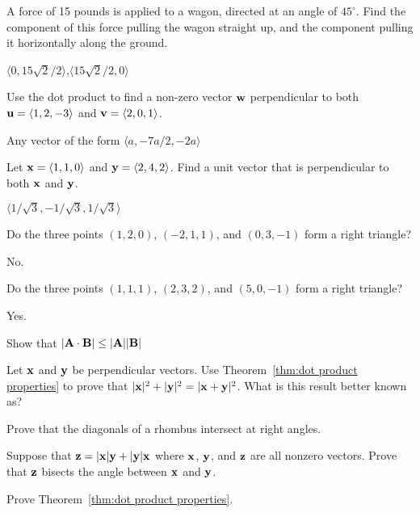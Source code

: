 \begin{enumialphparenastyle}
\begin{ex}
A force of 15 pounds is applied to a wagon, directed at an
angle of $45^\circ$. Find the component of this force pulling the
wagon straight up, and the component pulling it horizontally along
the ground.
\begin{sol}
	$\langle 0,15\sqrt2/2\rangle$,$\langle 15\sqrt2/2,0\rangle$
\end{sol}
\end{ex}

\begin{ex}
Use the dot product to find a non-zero vector ${\bf w}$
perpendicular to both ${\bf u}=\langle 1,2,-3\rangle$ and 
${\bf v}=\langle 2,0,1\rangle$.
\begin{sol}
	Any vector of the form $\langle a, -7a/2, -2a\rangle$
\end{sol}
\end{ex}

\begin{ex}
Let ${\bf x}=\langle 1,1,0 \rangle$ and ${\bf y}=\langle
2,4,2 \rangle$.  Find a unit vector that is perpendicular to both $\bf
x$ and $\bf y$.
\begin{sol}
	$\langle 1/\sqrt3,-1/\sqrt3,1/\sqrt3\rangle$
\end{sol}
\end{ex}

\begin{ex}
Do the three points $(1,2,0)$, $(-2,1,1)$, and $(0,3,-1)$
form a right triangle?
\begin{sol}
	No.
\end{sol}
\end{ex}

\begin{ex}
Do the three points $(1,1,1)$, $(2,3,2)$, and $(5,0,-1)$
form a right triangle?
\begin{sol}
	Yes.
\end{sol}
\end{ex}

\begin{ex}
Show that $|{\bf A}\cdot{\bf B}|\le|{\bf A}||{\bf B}|$
\end{ex}

\begin{ex}
Let $\bf x$ and $\bf y$ be perpendicular vectors.  Use
Theorem~\ref{thm:dot product properties} to prove that $|{\bf
  x}|^2+|{\bf y}|^2=|{\bf x}+{\bf y}|^2$.  What is this result better
known as?
\end{ex}

\begin{ex}
Prove that the diagonals of a rhombus intersect at right angles. 
\end{ex}

\begin{ex}
Suppose that ${\bf z}=|{\bf x}| {\bf y} + |{\bf y}| {\bf x}$
where $\bf x$, $\bf y$, and $\bf z$ are all nonzero vectors.  Prove
that $\bf z$ bisects the angle between $\bf x$ and $\bf y$.
\end{ex}

\begin{ex}
Prove Theorem~\ref{thm:dot product properties}.
\end{ex}

\end{enumialphparenastyle}